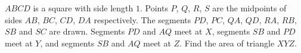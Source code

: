 $ABCD$ is a square with side length $1$. Points $P$, $Q$, $R$, $S$ are the midpoints of sides $AB$, $BC$, $CD$, $DA$ respectively. The segments $PD$, $PC$, $QA$, $QD$, $RA$, $RB$, $SB$ and $SC$ are drawn. Segments $PD$ and $AQ$ meet at $X$, segments $SB$ and $PD$ meet at $Y$, and segments $SB$ and $AQ$ meet at $Z$. Find the area of triangle $XYZ$.
